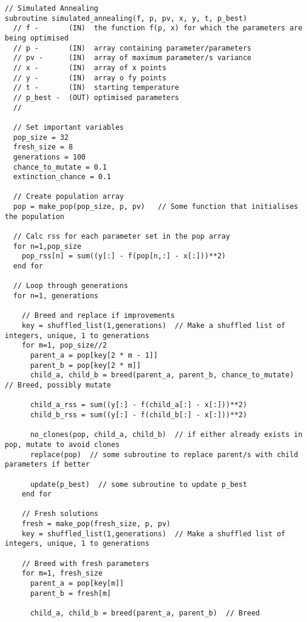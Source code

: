 \begin{lstlisting}[style=sPseudo,caption={Simple simulated annealing subroutine}]
// Simulated Annealing
subroutine simulated_annealing(f, p, pv, x, y, t, p_best)
  // f -       (IN)  the function f(p, x) for which the parameters are being optimised
  // p -       (IN)  array containing parameter/parameters
  // pv -      (IN)  array of maximum parameter/s variance
  // x -       (IN)  array of x points
  // y -       (IN)  array o fy points
  // t -       (IN)  starting temperature
  // p_best -  (OUT) optimised parameters
  //
  
  // Set important variables
  pop_size = 32
  fresh_size = 8
  generations = 100
  chance_to_mutate = 0.1
  extinction_chance = 0.1

  // Create population array
  pop = make_pop(pop_size, p, pv)   // Some function that initialises the population
  
  // Calc rss for each parameter set in the pop array
  for n=1,pop_size
    pop_rss[n] = sum((y[:] - f(pop[n,:] - x[:]))**2) 
  end for

  // Loop through generations
  for n=1, generations
  
    // Breed and replace if improvements
    key = shuffled_list(1,generations)  // Make a shuffled list of integers, unique, 1 to generations
    for m=1, pop_size//2 
      parent_a = pop[key[2 * m - 1]]
      parent_b = pop[key[2 * m]]
      child_a, child_b = breed(parent_a, parent_b, chance_to_mutate)  // Breed, possibly mutate
      
      child_a_rss = sum((y[:] - f(child_a[:] - x[:]))**2) 
      child_b_rss = sum((y[:] - f(child_b[:] - x[:]))**2) 
      
      no_clones(pop, child_a, child_b)  // if either already exists in pop, mutate to avoid clones
      replace(pop)  // some subroutine to replace parent/s with child parameters if better
      
      update(p_best)  // some subroutine to update p_best
    end for
    
    // Fresh solutions
    fresh = make_pop(fresh_size, p, pv)    
    key = shuffled_list(1,generations)  // Make a shuffled list of integers, unique, 1 to generations
    
    // Breed with fresh parameters
    for m=1, fresh_size 
      parent_a = pop[key[m]]
      parent_b = fresh[m]
      
      child_a, child_b = breed(parent_a, parent_b)  // Breed
      

\end{lstlisting}
